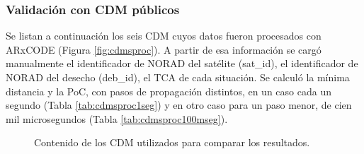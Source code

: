\subsubsection*{Validaci\'on con CDM p\'ublicos}

Se listan a continuaci\'on los seis CDM cuyos datos fueron procesados con ARxCODE (Figura \ref{fig:cdmsproc}). A partir de esa informaci\'on se carg\'o manualmente el identificador de NORAD del sat\'elite (sat\_id), el identificador de NORAD del desecho (deb\_id), el TCA de cada situaci\'on. Se calcul\'o la m\'inima distancia y la PoC, con pasos de propagaci\'on distintos, en un caso cada un segundo (Tabla \ref{tab:cdmsproc1seg}) y en otro caso para un paso menor, de cien mil microsegundos (Tabla \ref{tab:cdmsproc100mseg}).\\
 
 \begin{figure}[!h]
  \centering
  \caption{Contenido de los CDM utilizados para comparar los resultados.}
  \label{fig:tablamails}
\end{figure}
 
 \begin{table}[!h]
 \centering
 \caption{Resultados que se obtienen con ARxCODE a partir de la informaci\'on de los CDM, propagando cada 1 segundo - (Radio de colisi\'on $r_{a}=0.01$ km)}
 \label{tab:cdmsproc1seg}
 \end{table}
 
